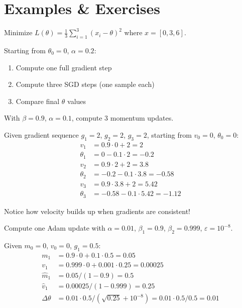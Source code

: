 \newpage
\section{Examples \& Exercises}


 Minimize $L(\theta) = \frac{1}{3}\sum_{i=1}^{3}(x_i - \theta)^2$ where $x = [0, 3, 6]$.

Starting from $\theta_0 = 0$, $\alpha = 0.2$:
\begin{enumerate}
    \item Compute one full gradient step
    \item Compute three SGD steps (one sample each)
    \item Compare final $\theta$ values
\end{enumerate}


\vspace{2em}
 With $\beta = 0.9$, $\alpha = 0.1$, compute 3 momentum updates.

Given gradient sequence $g_1 = 2$, $g_2 = 2$, $g_3 = 2$, starting from $v_0 = 0$, $\theta_0 = 0$:
\begin{align*}
    v_1 &= 0.9 \cdot 0 + 2 = 2 \\
    \theta_1 &= 0 - 0.1 \cdot 2 = -0.2 \\[6pt]
    v_2 &= 0.9 \cdot 2 + 2 = 3.8 \\
    \theta_2 &= -0.2 - 0.1 \cdot 3.8 = -0.58 \\[6pt]
    v_3 &= 0.9 \cdot 3.8 + 2 = 5.42 \\
    \theta_3 &= -0.58 - 0.1 \cdot 5.42 = -1.12
\end{align*}

Notice how velocity builds up when gradients are consistent!


\vspace{2em}
 Compute one Adam update with $\alpha = 0.01$, $\beta_1 = 0.9$, $\beta_2 = 0.999$, $\varepsilon = 10^{-8}$.

Given $m_0 = 0$, $v_0 = 0$, $g_1 = 0.5$:
\begin{align*}
    m_1 &= 0.9 \cdot 0 + 0.1 \cdot 0.5 = 0.05 \\
    v_1 &= 0.999 \cdot 0 + 0.001 \cdot 0.25 = 0.00025 \\
    \hat{m}_1 &= 0.05 / (1 - 0.9) = 0.5 \\
    \hat{v}_1 &= 0.00025 / (1 - 0.999) = 0.25 \\
    \Delta\theta &= 0.01 \cdot 0.5 / (\sqrt{0.25} + 10^{-8}) = 0.01 \cdot 0.5 / 0.5 = 0.01
\end{align*}


